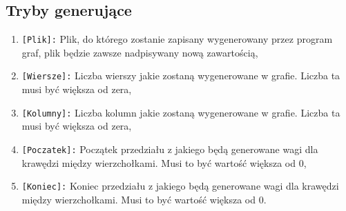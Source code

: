 \documentclass[10pt, a4paper]{report}
\begin{document}
    \subsection{Tryby generujące}
    \begin{enumerate}
      \item \texttt{[Plik]:}
      \newline Plik, do którego zostanie zapisany wygenerowany przez program graf, 
      plik będzie zawsze nadpisywany nową zawartością,
      
      \item \texttt{[Wiersze]:}
      \newline Liczba wierszy jakie zostaną wygenerowane w grafie. Liczba ta musi być większa od zera,
  
      \item \texttt{[Kolumny]:}
      \newline Liczba kolumn jakie zostaną wygenerowane w grafie. Liczba ta musi być większa od zera,
  
      \item \texttt{[Poczatek]:}
      \newline Początek przedziału z jakiego będą generowane wagi dla krawędzi między wierzchołkami. Musi to być wartość większa od 0,
  
      \item \texttt{[Koniec]:}
      \newline Koniec przedziału z jakiego będą generowane wagi dla krawędzi między wierzchołkami. Musi to być wartość większa od 0.
    \end{enumerate}
\end{document}
